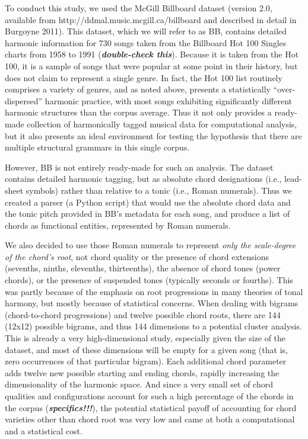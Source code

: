 To conduct this study, we used the McGill Billboard dataset (version 2.0, available from http:\slash \slash ddmal.music.mcgill.ca\slash billboard and described in detail in Burgoyne 2011). This dataset, which we will refer to as BB, contains detailed harmonic information for 730 songs taken from the Billboard Hot 100 Singles charts from 1958 to 1991 (\textbf{\emph{double-check this}}). Because it is taken from the Hot 100, it is a sample of songs that were popular at some point in their history, but does not claim to represent a single genre. In fact, the Hot 100 list routinely comprises a variety of genres, and as noted above, presents a statistically ``over-dispersed'' harmonic practice, with most songs exhibiting significantly different harmonic structures than the corpus average. Thus it not only provides a ready-made collection of harmonically tagged musical data for computational analysis, but it also presents an ideal environment for testing the hypothesis that there are multiple structural grammars in this single corpus.

However, BB is not entirely ready-made for such an analysis. The dataset contains detailed harmonic tagging, but as absolute chord designations (i.e., lead-sheet symbols) rather than relative to a tonic (i.e., Roman numerals). Thus we created a parser (a Python script) that would use the absolute chord data and the tonic pitch provided in BB's metadata for each song, and produce a list of chords as functional entities, represented by Roman numerals.

We also decided to use those Roman numerals to represent \emph{only the scale-degree of the chord's root}, not chord quality or the presence of chord extensions (sevenths, ninths, elevenths, thirteenths), the absence of chord tones (power chords), or the presence of suspended tones (typically seconds or fourths). This was partly because of the emphasis on root progressions in many theories of tonal harmony, but mostly because of statistical concerns. When dealing with bigrams (chord-to-chord progressions) and twelve possible chord roots, there are 144 (12x12) possible bigrams, and thus 144 dimensions to a potential cluster analysis. This is already a very high-dimensional study, especially given the size of the dataset, and most of these dimensions will be empty for a given song (that is, zero occurrences of that particular bigram). Each additional chord parameter adds twelve new possible starting and ending chords, rapidly increasing the dimensionality of the harmonic space. And since a very small set of chord qualities and configurations account for such a high percentage of the chords in the corpus (\textbf{\emph{specifics!!!}}), the potential statistical payoff of accounting for chord varieties other than chord root was very low and came at both a computational and a statistical cost.

